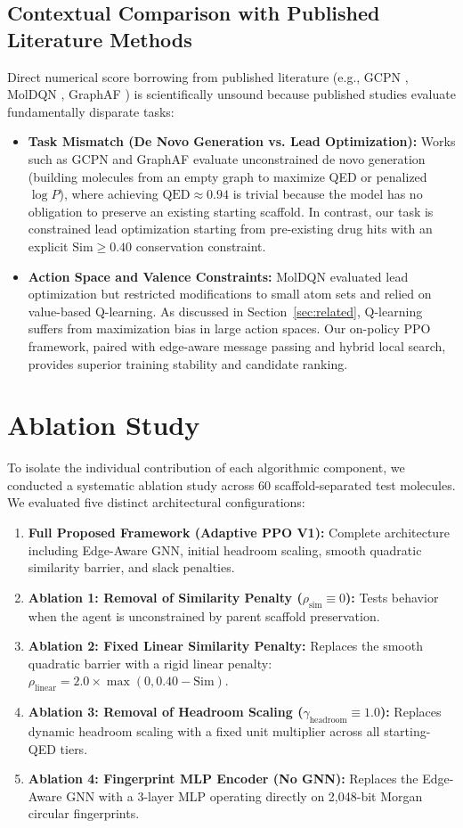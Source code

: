 \documentclass{ieeeaccess}
\begin{document}
\subsection{Contextual Comparison with Published Literature Methods}
Direct numerical score borrowing from published literature (e.g., GCPN \cite{you2018}, MolDQN \cite{zhou2019}, GraphAF \cite{shi2020}) is scientifically unsound because published studies evaluate fundamentally disparate tasks:
\begin{itemize}
    \item \textbf{Task Mismatch (De Novo Generation vs. Lead Optimization):} Works such as GCPN \cite{you2018} and GraphAF \cite{shi2020} evaluate unconstrained de novo generation (building molecules from an empty graph to maximize QED or penalized $\log P$), where achieving $\text{QED} \approx 0.94$ is trivial because the model has no obligation to preserve an existing starting scaffold. In contrast, our task is constrained lead optimization starting from pre-existing drug hits with an explicit $\text{Sim} \ge 0.40$ conservation constraint.
    \item \textbf{Action Space and Valence Constraints:} MolDQN \cite{zhou2019} evaluated lead optimization but restricted modifications to small atom sets and relied on value-based Q-learning. As discussed in Section~\ref{sec:related}, Q-learning suffers from maximization bias in large action spaces. Our on-policy PPO framework, paired with edge-aware message passing and hybrid local search, provides superior training stability and candidate ranking.
\end{itemize}


\section{Ablation Study}
\label{sec:ablation}
To isolate the individual contribution of each algorithmic component, we conducted a systematic ablation study across 60 scaffold-separated test molecules. We evaluated five distinct architectural configurations:
\begin{enumerate}
    \item \textbf{Full Proposed Framework (Adaptive PPO V1):} Complete architecture including Edge-Aware GNN, initial headroom scaling, smooth quadratic similarity barrier, and slack penalties.
    \item \textbf{Ablation 1: Removal of Similarity Penalty ($\rho_{\text{sim}} \equiv 0$):} Tests behavior when the agent is unconstrained by parent scaffold preservation.
    \item \textbf{Ablation 2: Fixed Linear Similarity Penalty:} Replaces the smooth quadratic barrier with a rigid linear penalty: $\rho_{\text{linear}} = 2.0 \times \max(0, 0.40 - \text{Sim})$.
    \item \textbf{Ablation 3: Removal of Headroom Scaling ($\gamma_{\text{headroom}} \equiv 1.0$):} Replaces dynamic headroom scaling with a fixed unit multiplier across all starting-QED tiers.
    \item \textbf{Ablation 4: Fingerprint MLP Encoder (No GNN):} Replaces the Edge-Aware GNN with a 3-layer MLP operating directly on 2,048-bit Morgan circular fingerprints.
\end{enumerate}
\end{document}
